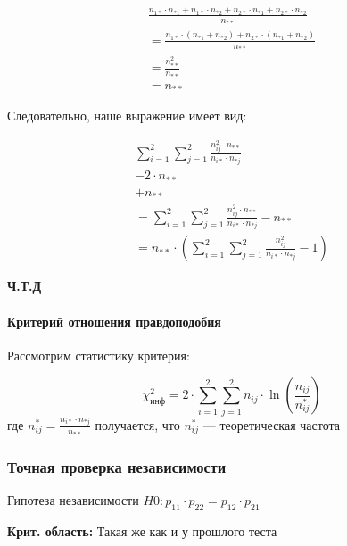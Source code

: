 \documentclass{article}
\begin{document}
    \quad

    \[
    \begin{gathered}
        \frac{n_{1*} \cdot n_{*1} + n_{1*} \cdot n_{*2} + n_{2*} \cdot n_{*1} + n_{2*} \cdot n_{*2}}{ n_{**}} \\
         = \frac{n_{1*} \cdot (n_{*1} + n_{*2}) + n_{2*} \cdot (n_{*1} + n_{*2})}{ n_{**}} \\
         = \frac{n_{**}^{2}}{n_{**}} \\
         = n_{**}
    \end{gathered}
    \]

    \quad

    Следовательно, наше выражение имеет вид:

    \quad

    \[
    \begin{gathered}
        \sum_{i=1}^{2}{\sum_{j=1}^{2}{  \frac{n_{ij}^{2} \cdot n_{**}}{ n_{i*} \cdot n_{*j} }  }} \\
         - 2 \cdot n_{**} \\
         + n_{**} \\
         = \sum_{i=1}^{2}{\sum_{j=1}^{2}{  \frac{n_{ij}^{2} \cdot n_{**}}{ n_{i*} \cdot n_{*j} }  }} - n_{**} \\
         = n_{**} \cdot (\sum_{i=1}^{2}{\sum_{j=1}^{2}{  \frac{n_{ij}^{2} }{ n_{i*} \cdot n_{*j} }  }} - 1)
    \end{gathered}
    \]
    
    \textbf{Ч.Т.Д}

    \paragraph{Критерий отношения правдоподобия}

    \quad


    Рассмотрим статистику критерия:

    \begin{equation}
        \chi^{2}_{\text{инф}} = 2 \cdot \sum_{i=1}^{2} {\sum_{j=1}^{2} {n_{ij} \cdot \ln(\frac{n_{ij}}{n_{ij}^{*}}) } }
    \end{equation}
    где $n_{ij}^{*} = \frac{n_{i*} \cdot n_{*j}}{n_{**}}$ получается, что $n_{ij}^{*}$ --- теоретическая частота

    
    \subsubsection{Точная проверка независимости}

    Гипотеза независимости $H0: p_{11} \cdot p_{22} = p_{12} \cdot p_{21}$

    \textbf{Крит. область:} Такая же как и у прошлого теста
\end{document}
